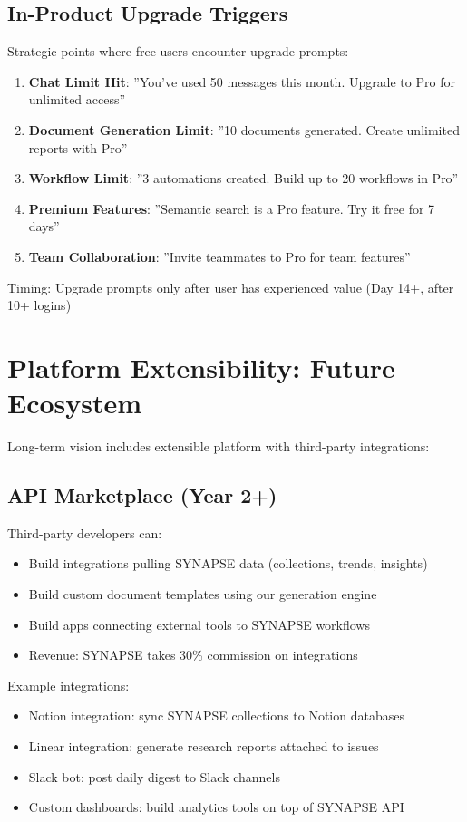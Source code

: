 \documentclass{report}
\begin{document}
\subsection{In-Product Upgrade Triggers}

Strategic points where free users encounter upgrade prompts:

\begin{enumerate}
    \item \textbf{Chat Limit Hit}: ''You've used 50 messages this month. Upgrade to Pro for unlimited access''
    \item \textbf{Document Generation Limit}: ''10 documents generated. Create unlimited reports with Pro''
    \item \textbf{Workflow Limit}: ''3 automations created. Build up to 20 workflows in Pro''
    \item \textbf{Premium Features}: ''Semantic search is a Pro feature. Try it free for 7 days''
    \item \textbf{Team Collaboration}: ''Invite teammates to Pro for team features''
\end{enumerate}

Timing: Upgrade prompts only after user has experienced value (Day 14+, after 10+ logins)

\section{Platform Extensibility: Future Ecosystem}

Long-term vision includes extensible platform with third-party integrations:

\subsection{API Marketplace (Year 2+)}

Third-party developers can:
\begin{itemize}
    \item Build integrations pulling SYNAPSE data (collections, trends, insights)
    \item Build custom document templates using our generation engine
    \item Build apps connecting external tools to SYNAPSE workflows
    \item Revenue: SYNAPSE takes 30\% commission on integrations
\end{itemize}

Example integrations:
\begin{itemize}
    \item Notion integration: sync SYNAPSE collections to Notion databases
    \item Linear integration: generate research reports attached to issues
    \item Slack bot: post daily digest to Slack channels
    \item Custom dashboards: build analytics tools on top of SYNAPSE API
\end{itemize}
\end{document}
